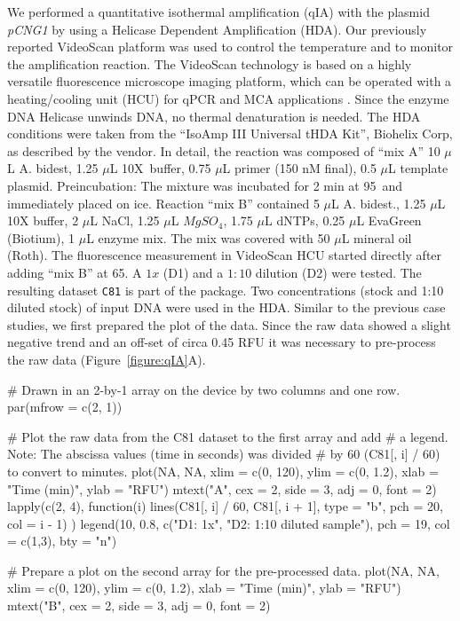 We performed a quantitative isothermal amplification (qIA) with the plasmid 
\textit{pCNG1} by using a Helicase Dependent Amplification (HDA). Our previously 
reported VideoScan platform \citep{rodiger_highly_2013} was used to control the 
temperature and to monitor the amplification reaction. The VideoScan technology 
is based on a highly versatile fluorescence microscope imaging platform, which 
can be operated with a heating/cooling unit (HCU) for qPCR and MCA applications 
\citep{roediger_RJ_2013, rodiger_highly_2013}. Since the enzyme DNA Helicase 
unwinds DNA, no thermal denaturation is needed. The HDA conditions were taken 
from the ``IsoAmp III Universal tHDA Kit'', Biohelix Corp, as described by the 
vendor. In detail, the reaction was composed of ``mix A'' 10 $\mu$L A. bidest, 
1.25 $\mu$L 10X~buffer, 0.75 $\mu$L primer (150 nM final), 0.5 $\mu$L template 
plasmid. Preincubation: The mixture was incubated for 2 min at 
95\textcelsius~and immediately placed on ice. Reaction ``mix B'' contained 5 
$\mu$L A. bidest., 1.25 $\mu$L 10X buffer, 2 $\mu$L NaCl, 1.25 $\mu$L 
$MgSO_{4}$, 1.75 $\mu$L dNTPs, 0.25 $\mu$L EvaGreen (Biotium), 1 $\mu$L enzyme 
mix. The mix was covered with 50 $\mu$L mineral oil (Roth). The fluorescence 
measurement in VideoScan HCU started directly after adding ``mix B'' at 
65\textcelsius. A $1x$ (D1) and a $1:10$ dilution (D2) were tested. The 
resulting dataset \texttt{C81} is part of the  package. Two 
concentrations (stock and 1:10 diluted stock) of input DNA were used in the HDA. 
Similar to the previous case studies, we first prepared the plot of the data. 
Since the raw data showed a slight negative trend and an off-set of circa 0.45 
RFU it was necessary to pre-process the raw data (Figure~\ref{figure:qIA}A).

\begin{example}
# Drawn in an 2-by-1 array on the device by two columns and one row.
par(mfrow = c(2, 1))

# Plot the raw data from the C81 dataset to the first array and add
# a legend. Note: The abscissa values (time in seconds) was divided 
# by 60 (C81[, i] / 60) to convert to minutes.
plot(NA, NA, xlim = c(0, 120), ylim = c(0, 1.2), xlab = "Time (min)", ylab = "RFU")
mtext("A", cex = 2, side = 3, adj = 0, font = 2)
lapply(c(2, 4), function(i) {
  lines(C81[, i] / 60, C81[, i + 1], type = "b", pch = 20, col = i - 1)
})
legend(10, 0.8, c("D1: 1x", "D2: 1:10 diluted sample"), pch = 19, col = c(1,3), bty = "n")

# Prepare a plot on the second array for the pre-processed data.
plot(NA, NA, xlim = c(0, 120), ylim = c(0, 1.2), xlab = "Time (min)", ylab = "RFU")
mtext("B", cex = 2, side = 3, adj = 0, font = 2)
\end{example}

